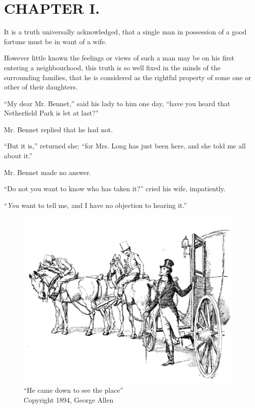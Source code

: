 \chapter{CHAPTER I.}

It is a truth universally acknowledged, that a single man in possession of a good fortune must be in want of a wife.

However little known the feelings or views of such a man may be on his first entering a neighbourhood, this truth is so well fixed in the minds of the surrounding families, that he is considered as the rightful property of some one or other of their daughters.

``My dear Mr. Bennet,'' said his lady to him one day, ``have you heard that Netherfield Park is let at last?''

Mr. Bennet replied that he had not.

``But it is,'' returned she; ``for Mrs. Long has just been here, and she told me all about it.''

Mr. Bennet made no answer.

``Do not you want to know who has taken it?'' cried his wife, impatiently.

``\textit{You} want to tell me, and I have no objection to hearing it.''
\begin{figure}[htbp]
    \centering
    \includegraphics[width=\textwidth]{illustrations/i_031.jpg}
    \caption{“He came down to see the place”\\ Copyright 1894, George Allen}
    \label{fig:image1}
\end{figure}

